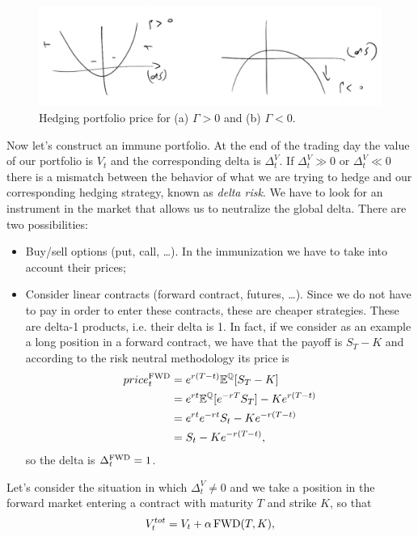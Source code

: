 \begin{figure}[htp]
    \centering
    \includegraphics[scale=0.3]{fig/tmp/fig23.png}
    \caption{Hedging portfolio price for (a) $\Gamma>0$ and (b) $\Gamma<0$.}
    \label{fig:pnl}
\end{figure}
\newline Now let's construct an immune portfolio. At the end of the trading day the value of our portfolio is $V_t$ and the corresponding delta is $\Delta^V_t$. If $\Delta^V_t\gg0$ or $\Delta^V_t\ll0$ there is a mismatch between the behavior of what we are trying to hedge and our corresponding hedging strategy, known as \emph{delta risk}. We have to look for an instrument in the market that allows us to neutralize the global delta. There are two possibilities:
\begin{itemize}
    \item Buy/sell options (put, call, \dots). In the immunization we have to take into account their prices;
    \item Consider linear contracts (forward contract, futures, \dots). Since we do not have to pay in order to enter these contracts, these are cheaper strategies. These are delta-1 products, i.e. their delta is 1. In fact, if we consider as an example a long position in a forward contract, we have that the payoff is $S_T-K$ and according to the risk neutral methodology its price is
    \begin{align*}
        price_t^{\operatorname{FWD}} &= e^{r(T-t)}\mathbb{E}^{\mathbb{Q}}[S_T-K]\\
        &=
        e^{rt}\mathbb{E}^{\mathbb{Q}}[e^{-rT}S_T] - Ke^{r(T-t)} \\
        &=
        e^{rt}e^{-rt}S_t - Ke^{-r(T-t)} \\
        &=
        S_t - Ke^{-r(T-t)},
    \end{align*}
    so the delta is $\Delta^{\operatorname{FWD}}_t=1$.
\end{itemize}
Let's consider the situation in which $\Delta^V_t\ne0$ and we take a position in the forward market entering a contract with maturity $T$ and strike $K$, so that
\begin{equation}
    V^{tot}_t = V_t + \alpha\operatorname{FWD}(T,K),
\end{equation}
